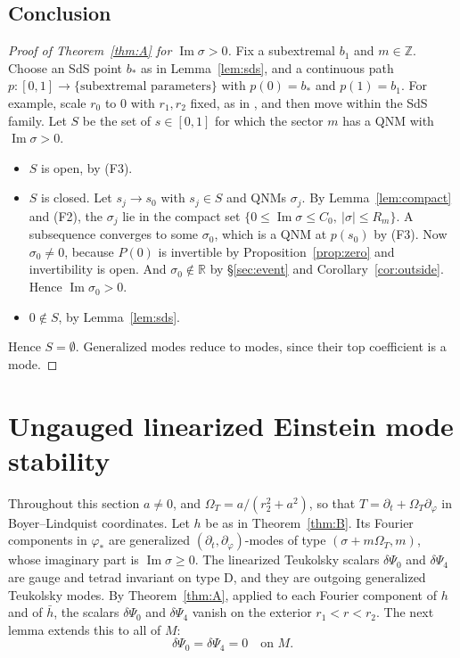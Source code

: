 \documentclass[11pt]{amsart}
\theoremstyle{definition}
\theoremstyle{remark}
\numberwithin{equation}{section}
\newcommand{\R}{\mathbb{R}}
\newcommand{\Z}{\mathbb{Z}}
\renewcommand{\Im}{\operatorname{Im}}
\begin{document}
\subsection{Conclusion}
\begin{proof}[Proof of Theorem~\ref{thm:A} for $\Im\sigma>0$]
Fix a subextremal $b_1$ and $m\in\Z$. Choose an SdS point $b_*$ as in Lemma~\ref{lem:sds}, and a continuous path
$p:[0,1]\to\{\text{subextremal parameters}\}$ with $p(0)=b_*$ and $p(1)=b_1$. For example, scale $r_0$ to $0$ with
$r_1,r_2$ fixed, as in \cite[\S6]{Hin26}, and then move within the SdS family. Let $S$ be the set of $s\in[0,1]$ for
which the sector $m$ has a QNM with $\Im\sigma>0$.
\begin{itemize}
\item $S$ is open, by (F3).
\item $S$ is closed. Let $s_j\to s_0$ with $s_j\in S$ and QNMs $\sigma_j$. By Lemma~\ref{lem:compact} and (F2), the
$\sigma_j$ lie in the compact set $\{0\le\Im\sigma\le C_0,\ |\sigma|\le R_m\}$. A subsequence converges to some
$\sigma_0$, which is a QNM at $p(s_0)$ by (F3). Now $\sigma_0\ne0$, because $P(0)$ is invertible by
Proposition~\ref{prop:zero} and invertibility is open. And $\sigma_0\notin\R$ by \S\ref{sec:event} and
Corollary~\ref{cor:outside}. Hence $\Im\sigma_0>0$.
\item $0\notin S$, by Lemma~\ref{lem:sds}.
\end{itemize}
Hence $S=\emptyset$. Generalized modes reduce to modes, since their top coefficient is a mode.
\end{proof}

\section{Ungauged linearized Einstein mode stability}\label{sec:B}

Throughout this section $a\ne0$, and $\Omega_T=a/(r_2^2+a^2)$, so that $T=\partial_t+\Omega_T\partial_\varphi$ in
Boyer--Lindquist coordinates. Let $h$ be as in Theorem~\ref{thm:B}. Its Fourier components in $\varphi_*$ are
generalized $(\partial_t,\partial_\varphi)$-modes of type $(\sigma+m\Omega_T,m)$, whose imaginary part is $\Im\sigma\ge0$. The linearized
Teukolsky scalars $\delta\Psi_0$ and $\delta\Psi_4$ are gauge and tetrad invariant on type D, and they are outgoing
generalized Teukolsky modes. By Theorem~\ref{thm:A}, applied to each Fourier component of $h$ and of $\bar h$, the scalars $\delta\Psi_0$ and
$\delta\Psi_4$ vanish on the exterior $r_1<r<r_2$. The next lemma extends this to all of $M$:
\[
\delta\Psi_0=\delta\Psi_4=0\quad\text{on }M.
\]
\end{document}
